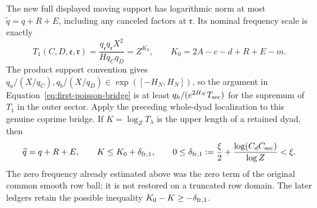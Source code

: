 \documentclass[12pt]{article}
\begin{document}
The new full displayed moving support has logarithmic norm at most
\(\widetilde q=q+R+E\), including any canceled factors at
\(\mathfrak r\).  Its nominal frequency scale is exactly
\[
 T_1(C,D,\mathfrak e,\mathfrak r)
 =\frac{q_{\mathfrak e}q_{\mathfrak r}X^2}
        {Hq_Cq_D}=Z^{K_0},
 \qquad K_0=2A-c-d+R+E-m.
\]
The product support convention gives
\(q_a/(X/q_C),q_b/(X/q_D)\in\exp([-H_N,H_N])\), so the
argument in Equation~\eqref{eq:first-poisson-bridge} is at least
\(q_h/(e^{2H_N}T_{\rm sec})\) for the supremum of \(T_1\)
in the outer sector.  Apply the preceding whole-dyad localization
to this genuine coprime bridge.  If \(K=\log_ZT_\lambda\) is
the upper length of a retained dyad, then
\begin{equation}
 \widetilde q=q+R+E,\qquad
 K\le K_0+\delta_{{\rm fr},1},\qquad
 0\le\delta_{{\rm fr},1}:=\frac\xi2+
       \frac{\log(C_dC_{\rm sec})}{\log Z}<\xi.
 \label{old-eq:2.3}
\end{equation}
The zero frequency already estimated above was the zero term of the
original common smooth row ball; it is not restored on a truncated
row domain.  The later ledgers retain the possible inequality
\(K_0-K\ge-\delta_{{\rm fr},1}\).
\end{document}

